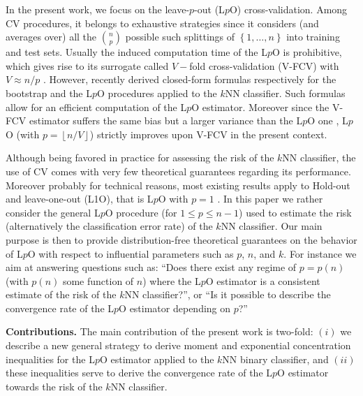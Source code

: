 \documentclass[twoside,11pt]{article}
\numberwithin{equation}{section}
\newcommand{\floor}[1]{\left\lfloor #1 \right\rfloor}
\newcommand{\1}{\mathds{1}}%
\newcommand{\acc}[1]{\left\{ #1 \right\}}
\numberwithin{equation}{section}
\theoremstyle{plain}
\begin{document}
In the present work, we focus on the leave-$p$-out (L$p$O) cross-validation.
Among CV procedures, it belongs to exhaustive strategies since it considers (and averages over) all the ${n\choose p}$ possible such splittings of $\acc{1,\ldots,n}$ into training and test sets.
%
Usually the induced computation time of the L$p$O is prohibitive, which gives rise to its surrogate called $V-$fold cross-validation (V-FCV) with $V\approx n/p$ \citep{Gei:1975}.
%
However, \cite{Steele_2009,CelisseMaryHuard11} recently derived closed-form formulas respectively for the bootstrap and the L$p$O procedures applied to the $k$NN classifier. Such formulas allow for an efficient computation of the L$p$O estimator. Moreover since the V-FCV estimator suffers the same bias but a larger variance than the L$p$O one \citep{CeRo08,ArCe_2010_survey}, L$p$O (with $p=\floor{n/V}$) strictly improves upon V-FCV in the present context.


\medskip


Although being favored in practice for assessing the risk of the $k$NN classifier,
the use of CV comes with very few theoretical guarantees regarding its performance.
%
Moreover probably for technical reasons, most existing results apply to Hold-out and leave-one-out (L1O), that is L$p$O with $p=1$ \citep{KeRo99}.
%
In this paper we rather consider the general L$p$O procedure (for $1\leq p \leq n-1$) used to estimate the risk (alternatively the classification error rate) of the $k$NN classifier. Our main purpose is then to provide distribution-free theoretical guarantees on the behavior of L$p$O with respect to influential parameters such as $p$, $n$, and $k$. For instance we aim at answering questions such as:  {``Does there exist any regime of $p=p(n)$ (with $p(n)$ some function of $n$) where the L$p$O estimator is a consistent estimate of the risk of the $k$NN classifier?'', or ``Is it possible to describe the convergence rate of the L$p$O estimator depending on $p$?''}


\noindent\textbf{Contributions.}
%
The main contribution of the present work is two-fold: $(i)$ we describe a new general strategy to derive moment and exponential concentration inequalities for the L$p$O estimator applied to the $k$NN binary classifier, and $(ii)$ these inequalities serve to derive the convergence rate of the L$p$O estimator towards the risk of the $k$NN classifier.
\end{document}
